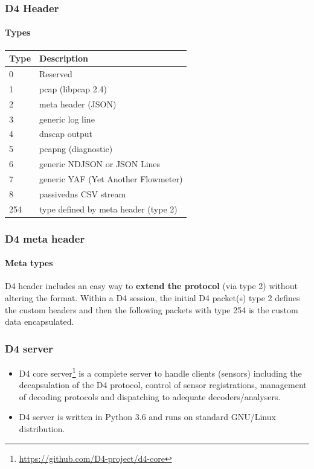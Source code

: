 \documentclass{beamer}
\begin{document}
\begin{frame}
    \frametitle{D4 Header}
    \framesubtitle{Types}
        \begin{tabular}{|l|l|}
            \hline
            Type &	Description\\
            \hline
            0 	& Reserved\\
            1 	& pcap (libpcap 2.4)\\
            2 	& meta header (JSON)\\
            3 	& generic log line\\
            4 	& dnscap output\\
            5 	& pcapng (diagnostic)\\
            6 	& generic NDJSON or JSON Lines\\
            7 	& generic YAF (Yet Another Flowmeter)\\
            8  	& passivedns CSV stream\\
            254 &	type defined by meta header (type 2)\\
            \hline
        \end{tabular}
\end{frame}

\begin{frame}
    \frametitle{D4 meta header}
    \framesubtitle{Meta types}
        D4 header includes an easy way to {\bf extend the protocol} (via type 2) without altering the format. Within a D4 session, the initial D4 packet(s) type 2 defines
        the custom headers and then the following packets with type 254 is the custom data encapsulated.
    \small
    
\end{frame}

\begin{frame}
    \frametitle{D4 server}
   \begin{itemize}
           \item D4 core server\footnote{\url{https://github.com/D4-project/d4-core}} is a complete server to handle clients (sensors) including the decapsulation of the D4 protocol, control of sensor registrations, management of decoding protocols and dispatching to adequate decoders/analysers.
           \item D4 server is written in Python 3.6 and runs on standard GNU/Linux distribution.
   \end{itemize}
\end{frame}
\end{document}
